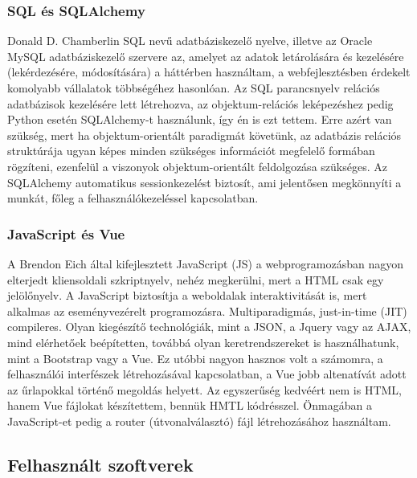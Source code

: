 \documentclass[a4paper,12pt]{article}
\begin{document}
\subsubsection{SQL és SQLAlchemy}

Donald D. Chamberlin SQL nevű adatbáziskezelő nyelve, illetve az Oracle MySQL 
adatbáziskezelő szervere az, amelyet az adatok letárolására és kezelésére (lekérdezésére, 
módosítására) a háttérben használtam, a webfejlesztésben érdekelt komolyabb vállalatok 
többségéhez hasonlóan. Az SQL parancsnyelv relációs adatbázisok kezelésére lett létrehozva, 
az objektum-relációs leképezéshez pedig Python esetén SQLAlchemy-t használunk, így én is ezt 
tettem. Erre azért van szükség, mert ha objektum-orientált paradigmát követünk, az adatbázis 
relációs struktúrája ugyan képes minden szükséges információt megfelelő formában rögzíteni, 
ezenfelül a viszonyok objektum-orientált feldolgozása szükséges. Az SQLAlchemy automatikus 
sessionkezelést biztosít, ami jelentősen megkönnyíti a munkát, főleg a felhasználókezeléssel 
kapcsolatban.

\subsubsection{JavaScript és Vue}

A Brendon Eich által kifejlesztett JavaScript (JS) a webprogramozásban nagyon elterjedt
kliensoldali szkriptnyelv, nehéz megkerülni, mert a HTML csak egy jelölőnyelv. A JavaScript 
biztosítja a weboldalak interaktivitását is, mert alkalmas az eseményvezérelt programozásra. 
Multiparadigmás, just-in-time (JIT) compileres. Olyan kiegészítő technológiák, mint a JSON, 
a Jquery vagy az AJAX, mind elérhetőek beépítetten, továbbá olyan keretrendszereket is 
használhatunk, mint a Bootstrap vagy a Vue. Ez utóbbi nagyon hasznos volt a számomra, a 
felhasználói interfészek létrehozásával kapcsolatban, a Vue jobb altenatívát adott az 
űrlapokkal történő megoldás helyett. Az egyszerűség kedvéért nem is HTML, hanem Vue fájlokat
készítettem, bennük HMTL kódrésszel. Önmagában a JavaScript-et pedig a router 
(útvonalválasztó) fájl létrehozásához használtam.

\subsection{Felhasznált szoftverek}
\end{document}

